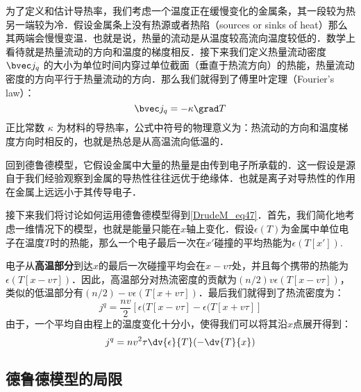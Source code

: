 为了定义和估计导热率，我们考虑一个温度正在缓慢变化的金属条，其一段较为热另一端较为冷．假设金属条上没有热源或者热陷（sources or sinks of heat）那么其两端会慢慢变温．也就是说，热量的流动是从温度较高流向温度较低的．数学上看待就是热量流动的方向和温度的梯度相反．接下来我们定义热量流动密度 $\bvec j_q$ 的大小为单位时间内穿过单位截面（垂直于热流方向）的热能，热量流动密度的方向平行于热量流动的方向．那么我们就得到了傅里叶定理（Fourier's law）：
\begin{equation}
\bvec j_q =-\kappa\grad T
\end{equation}
正比常数 $\kappa$ 为材料的导热率，公式中符号的物理意义为：热流动的方向和温度梯度方向时相反的，也就是热总是从高温流向低温的．

回到德鲁德模型，它假设金属中大量的热量是由传到电子所承载的．这一假设是源自于我们经验观察到金属的导热性往往远优于绝缘体．也就是离子对导热性的作用在金属上远远小于其传导电子．

接下来我们将讨论如何运用德鲁德模型得到\autoref{DrudeM_eq47}．首先，我们简化地考虑一维情况下的模型，也就是能量只能在$x$轴上变化．假设$\epsilon(T)$为金属中单位电子在温度$T$时的热能，那么一个电子最后一次在$x'$碰撞的平均热能为$\epsilon(T[x'])$.

电子从\textbf{高温部分}到达$x$的最后一次碰撞平均会在$x-v\tau$处，并且每个携带的热能为$\epsilon(T[x-v\tau])$．因此，高温部分对热流密度的贡献为$(n/2)v\epsilon(T[x-v\tau])$，类似的低温部分有$(n/2)-v\epsilon(T[x+v\tau])$．最后我们就得到了热流密度为：
\begin{equation}
j^q = \frac{nv}{2}[\epsilon(T[x-v\tau]-\epsilon(T[x+v\tau]]
\end{equation}
由于，一个平均自由程上的温度变化十分小，使得我们可以将其沿$x$点展开得到：
\begin{equation}
j^q = nv^2\tau\dv{\epsilon}{T}(-\dv{T}{x})
\end{equation}



\subsection{德鲁德模型的局限}

